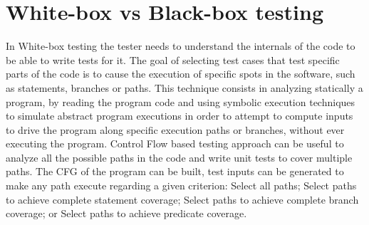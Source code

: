 {%
}
\section{White-box vs Black-box testing}
In White-box testing the tester needs to understand the internals of
the code to be able to write tests for it.
The goal of selecting test cases that test specific parts of the code
is to cause the execution of specific spots in the software, such as
statements, branches or
paths.
This technique consists in analyzing statically a program, by reading
the program code and using symbolic execution techniques to simulate
abstract program
executions in order to attempt to compute inputs to drive the program
along specific execution paths or branches, without ever executing the
program. Control Flow based testing approach can be useful to analyze all the
possible paths in the code and write unit tests to cover multiple paths.
The \ac{CFG} of the program can be built,
test inputs can be generated to make any path execute regarding a given criterion:
Select all paths;
Select paths to achieve complete statement
coverage\cite{stt,Ntafos:1988:CST:630792.631017};
Select paths to achieve complete branch coverage\cite{Roper1994,stt};
or Select paths to achieve predicate
coverage\cite{stt,Ntafos:1988:CST:630792.631017}.

